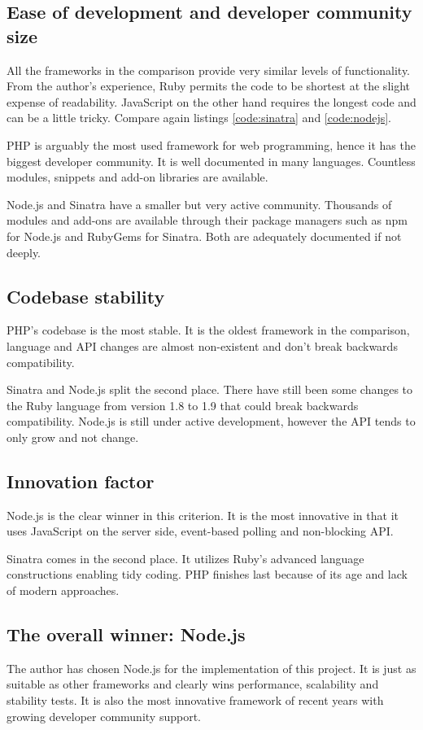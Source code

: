 \documentclass[12pt,oneside]{fithesis}
\begin{document}
	\subsection{Ease of development and developer community size}
		All the frameworks in the comparison provide very similar levels of functionality. From the author's experience, Ruby permits the code to be shortest at the slight expense of readability. JavaScript on the other hand requires the longest code and can be a little tricky. Compare again listings \ref{code:sinatra} and \ref{code:nodejs}.
		
		PHP is arguably the most used framework for web programming, hence it has the biggest developer community. It is well documented in many languages. Countless modules, snippets and add-on libraries are available.
		
		Node.js and Sinatra have a smaller but very active community. Thousands of modules and add-ons are available through their package managers such as npm for Node.js and RubyGems for Sinatra. Both are adequately documented if not deeply. 
		
	\subsection{Codebase stability}
		PHP's codebase is the most stable. It is the oldest framework in the comparison, language and API changes are almost non-existent and don't break backwards compatibility.
		
		Sinatra and Node.js split the second place. There have still been some changes to the Ruby language from version 1.8 to 1.9 that could break backwards compatibility. Node.js is still under active development, however the API tends to only grow and not change.
		
	\subsection{Innovation factor}
		Node.js is the clear winner in this criterion. It is the most innovative in that it uses JavaScript on the server side, event-based polling and non-blocking API.
		
		Sinatra comes in the second place. It utilizes Ruby's advanced language constructions enabling tidy coding. PHP finishes last because of its age and lack of modern approaches.
		
	\subsection{The overall winner: Node.js}
		The author has chosen Node.js for the implementation of this project. It is just as suitable as other frameworks and clearly wins performance, scalability and stability tests. It is also the most innovative framework of recent years with growing developer community support.
		
\end{document}
